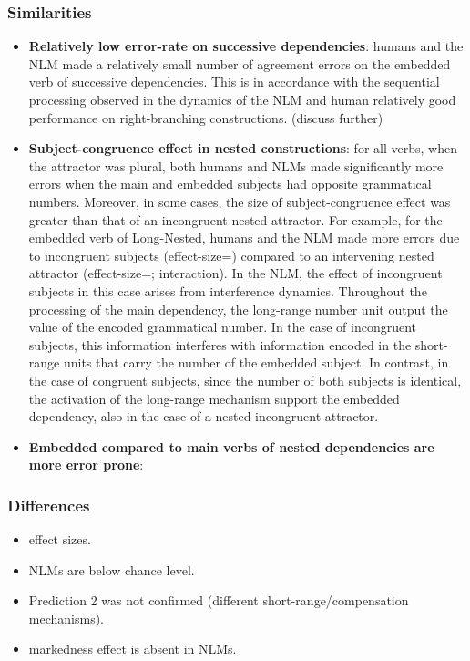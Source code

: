 \subsubsection{Similarities}
\begin{itemize}
    \item \textbf{Relatively low error-rate on successive dependencies}: humans and the NLM made a relatively small number of agreement errors on the embedded verb of successive dependencies. This is in accordance with the sequential processing observed in the dynamics of the NLM and human relatively good performance on right-branching constructions. (discuss further) 
    \item \textbf{Subject-congruence effect in nested constructions}: for all verbs, when the attractor was plural, both humans and NLMs made significantly more errors when the main and embedded subjects had opposite grammatical numbers. Moreover, in some cases, the size of subject-congruence effect was greater than that of an incongruent nested attractor. For example, for the embedded verb of Long-Nested, humans and the NLM made more errors due to incongruent subjects (effect-size=) compared to an intervening nested attractor (effect-size=; interaction). In the NLM, the effect of incongruent subjects in this case arises from interference dynamics. Throughout the processing of the main dependency, the long-range number unit output the value of the encoded grammatical number. In the case of incongruent subjects, this information interferes with information encoded in the short-range units that carry the number of the embedded subject. In contrast, in the case of congruent subjects, since the number of both subjects is identical, the activation of the long-range mechanism support the embedded dependency, also in the case of a nested incongruent attractor.
    \item \textbf{Embedded compared to main verbs of nested dependencies are more error prone}:
    
\end{itemize}
\subsubsection{Differences}
    \begin{itemize}
        \item effect sizes. 
	\item NLMs are below chance level. 
        \item Prediction 2 was not confirmed (different short-range/compensation mechanisms).
        \item markedness effect is absent in NLMs. 
    \end{itemize}
    
